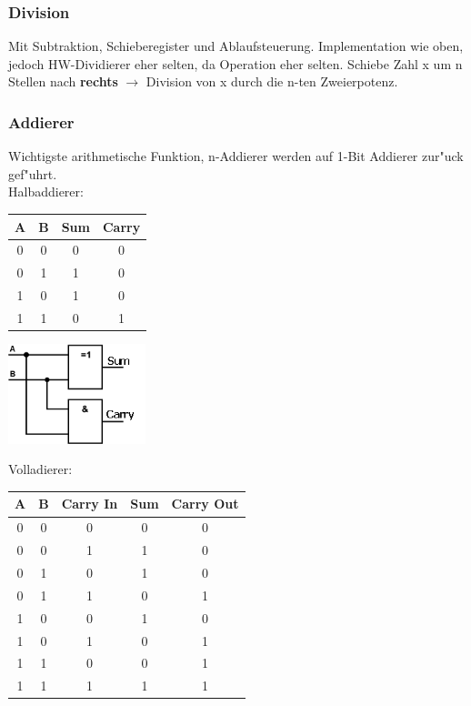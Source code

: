 \subsubsection{Division}
Mit Subtraktion, Schieberegister und Ablaufsteuerung. 
Implementation wie oben, jedoch HW-Dividierer eher selten, da Operation eher selten. Schiebe Zahl x um n Stellen nach \textbf{rechts} $\rightarrow$ Division von x durch die n-ten Zweierpotenz.\\
\subsubsection{Addierer}
Wichtigste arithmetische Funktion, n-Addierer werden auf 1-Bit Addierer zur"uck gef"uhrt. \\
Halbaddierer:\\
\begin{tabular}{|c | c | c | c |}
\hline
A & B & Sum & Carry\\
\hline
0 & 0 & 0 & 0\\
\hline
0 & 1 & 1 & 0\\
\hline
1 & 0 & 1 & 0\\
\hline
1 & 1 & 0 & 1\\
\hline
\end{tabular}
\begin{flushleft}
{\includegraphics[width=0.3\textwidth]{images/Arithmetik/halbaddierer.png}}
\label{Fig: Halbaddierer}
\end{flushleft}

Volladierer:\\


\begin{tabular}{|c | c | c | c | c |}
\hline
A & B & Carry In & Sum & Carry Out\\
\hline
0 & 0 & 0 & 0 & 0\\
\hline
0 & 0 & 1 & 1 & 0\\
\hline
0 & 1 & 0 & 1 & 0\\
\hline
0 & 1 & 1 & 0 & 1\\
\hline
1 & 0 & 0 & 1 & 0\\
\hline
1 & 0 & 1 & 0 & 1\\
\hline
1 & 1 & 0 & 0 & 1\\
\hline
1 & 1 & 1 & 1 & 1\\
\hline
\end{tabular}

